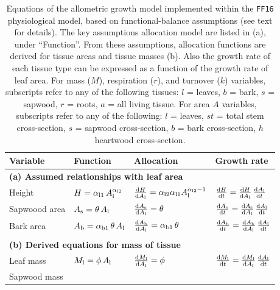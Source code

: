 \documentclass[10pt,twoside]{article}
\begin{document}
\begin{table}[h!]
\caption{Equations of the allometric growth model implemented within the \texttt{FF16} physiological model, based on functional-balance assumptions (see text for details).
The key assumptions allocation model are listed in (a), under ``Function''. From these
assumptions, allocation functions are derived for tissue areas and tissue masses (b). Also
the growth rate of each tissue type can be expressed as a function of the growth rate of leaf area. For mass ($M$), respiration ($r$), and turnover ($k$)
variables, subscripts refer to any of the following tissues: \(l\) = leaves, \(b\) = bark, \(s\) = sapwood,
\(r\) = roots, \(a\) = all living tissue. For area \(A\) variables, subscripts refer to any of the following: \(l\) = leaves, \(st\) = total stem cross-section, \(s\) = sapwood cross-section, \(b\) = bark cross-section, \(h\)heartwood cross-section.}
\centering
\begin{tabular}{p{2.5cm}p{3.5cm}p{5cm}p{4cm} }\\ \hline
Variable & Function & Allocation & Growth rate\\ \hline
\multicolumn{4}{l}{\textbf{(a) Assumed relationships with leaf area}} \\
Height &
$H = \alpha_{{\rm l1}} \, A_{\rm l  }^{\alpha_{{\rm l2}}}$ &
$\frac{{\rm d}H}{{\rm d}A_{\rm l}} = \alpha_{{\rm l2}} \alpha_{{\rm l1}} A_{\rm l}^{\alpha_{{\rm l2}}-1}$ &
$\frac{{\rm d}H}{{\rm d}t} = \frac{{\rm d}H}{{\rm d}A_{\rm l}} \, \frac{{\rm d}A_{\rm l}}{{\rm d}t}$ \\
Sapwoood area &
$A_{\rm s} = \theta \, A_{\rm l}$ &
$\frac{{\rm d}A_{\rm s}}{{\rm d} A_{\rm l}} = \theta$ &
$\frac{{\rm d}A_{\rm s}}{{\rm d}t} = \frac{{\rm d}A_{\rm s}}{{\rm d} A_{\rm l}} \, \frac{{\rm d}A_{\rm l}}{{\rm d}t}$ \\
Bark area &
$A_{\rm b} = \alpha_{{\rm b1}} \, \theta \, A_{\rm l}$ &
$\frac{{\rm d}A_{\rm b}}{{\rm d} A_{\rm l}} = \alpha_{{\rm b1}} \, \theta$ &
$\frac{{\rm d}A_{\rm b}}{{\rm d}t} = \frac{{\rm d}A_{\rm b}}{{\rm d} A_{\rm l}} \, \frac{{\rm d}A_{\rm l}}{{\rm d}t}$ \\ \\
\multicolumn{4}{l}{\textbf{(b) Derived equations for mass of tissue }} \\
Leaf mass &
$M_{\rm l} = \phi \, A_{\rm l} $ &
$\frac{{\rm d}M_{\rm l}}{{\rm d}A_{\rm l}} = \phi$ &
$\frac{{\rm d}M_{\rm l}}{{\rm d}t} = \frac{{\rm d}M_{\rm l}}{{\rm d}A_{\rm l}} \, \frac{{\rm d}A_{\rm l}}{{\rm d}t}$ \\
Sapwood mass &

\end{tabular}
\end{table}
\end{document}
